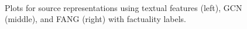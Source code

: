 \documentclass[sigconf,anonymous]{acmart}
\theoremstyle{definition}
\theoremstyle{hypothesis}
\begin{document}

\begin{figure}[t]
\centering
{}
\\
\caption{Plots for source representations using textual features (left), GCN (middle), and FANG (right) with factuality labels.}
\label{fig:source_rep}
\end{figure}
\end{document}
